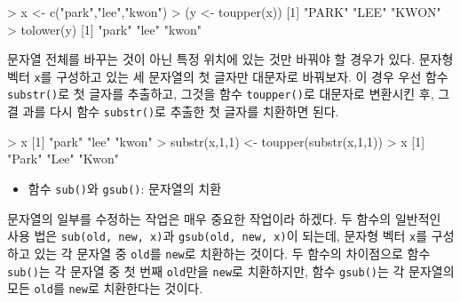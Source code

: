 \documentclass[
]{book}
\newenvironment{Shaded}{\begin{snugshade}}{\end{snugshade}}
\newcommand{\DecValTok}[1]{\textcolor[rgb]{0.00,0.00,0.81}{#1}}
\newcommand{\FunctionTok}[1]{\textcolor[rgb]{0.00,0.00,0.00}{#1}}
\newcommand{\NormalTok}[1]{#1}
\newcommand{\OtherTok}[1]{\textcolor[rgb]{0.56,0.35,0.01}{#1}}
\newcommand{\SpecialCharTok}[1]{\textcolor[rgb]{0.00,0.00,0.00}{#1}}
\newcommand{\StringTok}[1]{\textcolor[rgb]{0.31,0.60,0.02}{#1}}
\providecommand{\tightlist}{%
  \setlength{\itemsep}{0pt}\setlength{\parskip}{0pt}}
\begin{document}
\begin{Shaded}
\begin{Highlighting}[]
\SpecialCharTok{\textgreater{}}\NormalTok{ x }\OtherTok{\textless{}{-}} \FunctionTok{c}\NormalTok{(}\StringTok{"park"}\NormalTok{,}\StringTok{"lee"}\NormalTok{,}\StringTok{"kwon"}\NormalTok{)}
\SpecialCharTok{\textgreater{}}\NormalTok{ (y }\OtherTok{\textless{}{-}} \FunctionTok{toupper}\NormalTok{(x))}
\NormalTok{[}\DecValTok{1}\NormalTok{] }\StringTok{"PARK"} \StringTok{"LEE"}  \StringTok{"KWON"}
\SpecialCharTok{\textgreater{}} \FunctionTok{tolower}\NormalTok{(y)}
\NormalTok{[}\DecValTok{1}\NormalTok{] }\StringTok{"park"} \StringTok{"lee"}  \StringTok{"kwon"}
\end{Highlighting}
\end{Shaded}

문자열 전체를 바꾸는 것이 아닌 특정 위치에 있는 것만 바꿔야 할 경우가 있다. 문자형
벡터 \texttt{x}를 구성하고 있는 세 문자열의 첫 글자만 대문자로 바꿔보자. 이 경우 우선 함수
\texttt{substr()}로 첫 글자를 추출하고, 그것을 함수 \texttt{toupper()}로 대문자로 변환시킨 후, 그 결
과를 다시 함수 \texttt{substr()}로 추출한 첫 글자를 치환하면 된다.

\begin{Shaded}
\begin{Highlighting}[]
\SpecialCharTok{\textgreater{}}\NormalTok{ x}
\NormalTok{[}\DecValTok{1}\NormalTok{] }\StringTok{"park"} \StringTok{"lee"}  \StringTok{"kwon"}
\SpecialCharTok{\textgreater{}} \FunctionTok{substr}\NormalTok{(x,}\DecValTok{1}\NormalTok{,}\DecValTok{1}\NormalTok{) }\OtherTok{\textless{}{-}} \FunctionTok{toupper}\NormalTok{(}\FunctionTok{substr}\NormalTok{(x,}\DecValTok{1}\NormalTok{,}\DecValTok{1}\NormalTok{))}
\SpecialCharTok{\textgreater{}}\NormalTok{ x}
\NormalTok{[}\DecValTok{1}\NormalTok{] }\StringTok{"Park"} \StringTok{"Lee"}  \StringTok{"Kwon"}
\end{Highlighting}
\end{Shaded}

\begin{itemize}
\tightlist
\item
  함수 \texttt{sub()}와 \texttt{gsub()}: 문자열의 치환
\end{itemize}

문자열의 일부를 수정하는 작업은 매우 중요한 작업이라 하겠다. 두 함수의 일반적인 사용
법은 \texttt{sub(old,\ new,\ x)}과 \texttt{gsub(old,\ new,\ x)}이 되는데, 문자형 벡터 \texttt{x}를 구성하고 있는 각 문자열 중 \texttt{old}를 \texttt{new}로 치환하는 것이다. 두 함수의 차이점으로 함수 \texttt{sub()}는 각 문자열 중 첫 번째 \texttt{old}만을 \texttt{new}로 치환하지만, 함수 \texttt{gsub()}는 각 문자열의 모든
\texttt{old}를 \texttt{new}로 치환한다는 것이다.
\end{document}
